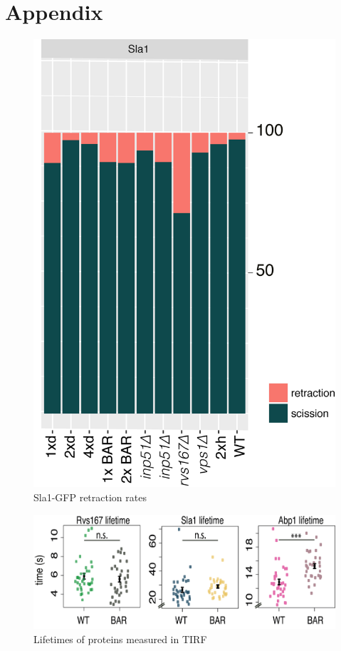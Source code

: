 \chapter{Appendix} %
\label{Ch:Appendix}

\begin{figure}[H]
\includegraphics[scale=1.5]{figures/appendix/retraction_rates_all}
\caption{Sla1-GFP retraction rates}
\end{figure}


\begin{figure}[H]
	\hspace{-1cm}
	\includegraphics[scale=0.4]{figures/appendix/delsh3_5}
	\caption{Lifetimes of proteins measured in TIRF}
\end{figure}